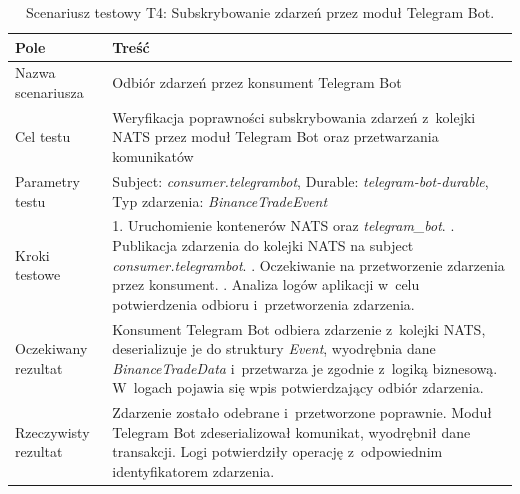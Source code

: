 \begin{table}[H]
    \centering
    \caption{Scenariusz testowy T4: Subskrybowanie zdarzeń przez moduł Telegram Bot.}
    \label{tab:test_telegram_subscribe}
    \begin{tabular}{|p{}|p{}|}
        \hline
        \textbf{Pole}        & \textbf{Treść}                                                                                                                                                                                                                                                                                                          \\ \hline
        Nazwa scenariusza    & Odbiór zdarzeń przez konsument Telegram Bot                                                                                                                                                                                                                                                                             \\ \hline
        Cel testu            & Weryfikacja poprawności subskrybowania zdarzeń z~kolejki NATS przez moduł Telegram Bot oraz przetwarzania komunikatów                                                                                                                                                                                                   \\ \hline
        Parametry testu      & Subject: \textit{consumer.telegrambot}, Durable: \textit{telegram-bot-durable}, Typ zdarzenia: \textit{BinanceTradeEvent}                                                                                                                                                                                               \\ \hline
        Kroki testowe        & 1. Uruchomienie kontenerów NATS oraz \textit{telegram\_bot}. \newline 2. Publikacja zdarzenia do kolejki NATS na subject \textit{consumer.telegrambot}. \newline 3. Oczekiwanie na przetworzenie zdarzenia przez konsument. \newline 4. Analiza logów aplikacji w~celu potwierdzenia odbioru i~przetworzenia zdarzenia. \\ \hline
        Oczekiwany rezultat  & Konsument Telegram Bot odbiera zdarzenie z~kolejki NATS, deserializuje je do struktury \textit{Event}, wyodrębnia dane \textit{BinanceTradeData} i~przetwarza je zgodnie z~logiką biznesową. W~logach pojawia się wpis potwierdzający odbiór zdarzenia.                                                                 \\ \hline
        Rzeczywisty rezultat & Zdarzenie zostało odebrane i~przetworzone poprawnie. Moduł Telegram Bot zdeserializował komunikat, wyodrębnił dane transakcji. Logi potwierdziły operację z~odpowiednim identyfikatorem zdarzenia.                                                                                                                      \\ \hline
    \end{tabular}
\end{table}

